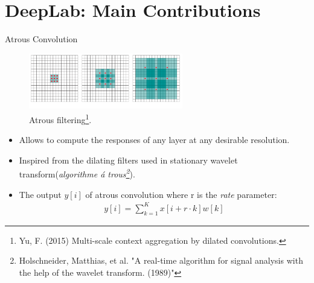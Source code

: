 \documentclass{beamer}
\begin{document}
\section{DeepLab: Main Contributions}
\begin{frame}{Atrous Convolution}
\vspace{-0.15cm}
\begin{figure}
	\centering
	\includegraphics[width=0.6\textwidth]{figure/ss19.png}
	\captionsetup{justification=centering}
	\vspace{-0.25cm}
	\caption{Atrous filtering\footnote{Yu, F. (2015) Multi-scale context aggregation by dilated convolutions. }.}	
\end{figure}
\begin{itemize}
	\vspace{-0.45cm}
	\item Allows to compute the responses of any layer at any desirable resolution.
	\item<2-> Inspired from the {\color{blue}dilating filters} used in stationary wavelet transform(\textit{algorithme \'a trous\footnote{Holschneider, Matthias, et al. "A real-time algorithm for signal analysis with the help of the wavelet transform. (1989)"}}).
	\item<3-> The output $y[i]$ of atrous convolution where {\color{blue}r} is the \textit{rate} parameter:
	\vspace{-0.15cm} 
	\begin{align*}
		y\left[i\right] =\sum_{k=1}^{K}x[i+r\cdot k]w[k] 
	\end{align*}		
\end{itemize}	
\end{frame}
\end{document}
